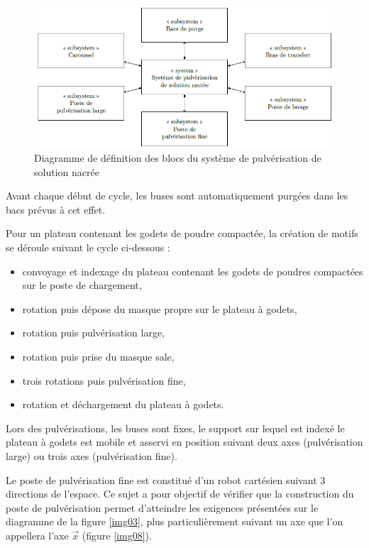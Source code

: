\begin{figure}[!h]
\centering\includegraphics[width=0.8\linewidth]{img/fig04}
 \caption{Diagramme de définition des blocs du système de pulvérisation de solution nacrée}
 \label{img04}
\end{figure}

Avant chaque début de cycle, les buses sont automatiquement purgées dans les bacs prévus à cet effet.

Pour un plateau contenant les godets de poudre compactée, la création de motifs se déroule suivant le cycle ci-dessous :
\begin{itemize}
 \item convoyage et indexage du plateau contenant les godets de poudres compactées sur le poste de chargement,
 \item rotation puis dépose du masque propre sur le plateau à godets,
 \item rotation puis pulvérisation large,
 \item rotation puis prise du masque sale,
 \item trois rotations puis pulvérisation fine,
 \item rotation et déchargement du plateau à godets.
\end{itemize}

Lors des pulvérisations, les buses sont fixes, le support sur lequel est indexé le plateau à godets est mobile et asservi en position suivant deux axes (pulvérisation large) ou trois axes (pulvérisation fine).

Le poste de pulvérisation fine est constitué d’un robot cartésien suivant 3 directions de l’espace. Ce sujet a pour objectif de vérifier que la construction du poste de pulvérisation permet d’atteindre les exigences présentées sur le diagramme de la figure \ref{img03}, plus particulièrement suivant un axe que l’on appellera l’axe $\overrightarrow{x}$ (figure \ref{img08}).

